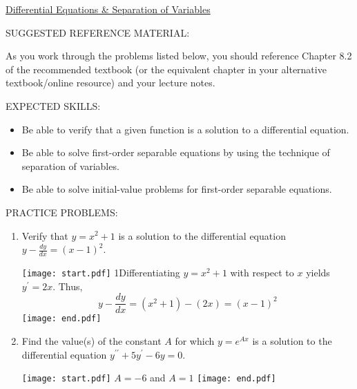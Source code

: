 \documentclass[12pt]{article}
\begin{document}
\begin{center}
\underline{\LARGE{Differential Equations \& Separation of Variables}}
\end{center}

\noindent SUGGESTED REFERENCE MATERIAL:

\bigskip

\noindent As you work through the problems listed below, you should reference Chapter 8.2 of the recommended textbook (or the equivalent chapter in your alternative textbook/online resource) and your lecture notes.

\bigskip

\noindent EXPECTED SKILLS:

\begin{itemize}

\item Be able to verify that a given function is a solution to a differential equation.

\item Be able to solve first-order separable equations by using the technique of separation of variables.

\item Be able to solve initial-value problems for first-order separable equations. 

\end{itemize}

\noindent PRACTICE PROBLEMS:

\medskip

\begin{enumerate}

\item Verify that $y=x^2+1$ is a solution to the differential equation $y-\frac{dy}{dx}=(x-1)^2$.

\texttt{[image: start.pdf]}
{{{1\linewidth}{Differentiating $y=x^2+1$ with respect to $x$ yields $y^{\prime}=2x$.  Thus,\\
 $$y-\frac{dy}{dx}=(x^2+1)-(2x)=(x-1)^2$$}}}
\texttt{[image: end.pdf]}


\item Find the value(s) of the constant $A$ for which $y=e^{Ax}$ is a solution to the differential equation $y^{\prime\prime}+5y^{\prime}-6y=0$.

\texttt{[image: start.pdf]}
{{$A=-6$ and $A=1$}}
\texttt{[image: end.pdf]}


\end{enumerate}

\end{document}
